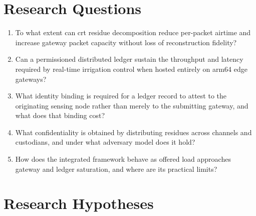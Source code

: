 \documentclass[12pt,a4paper,oneside]{book}
\begin{document}
\section{Research Questions}
\label{sec:research_questions}

\begin{enumerate}[label=\textbf{RQ\arabic*.}]
  \item To what extent can \gls{crt} residue decomposition reduce per-packet
        airtime and increase gateway packet capacity without loss of
        reconstruction fidelity?
  \item Can a permissioned distributed ledger sustain the throughput and latency
        required by real-time irrigation control when hosted entirely on
        \gls{arm64} edge gateways?
  \item What identity binding is required for a ledger record to attest to the
        originating sensing node rather than merely to the submitting gateway,
        and what does that binding cost?
  \item What confidentiality is obtained by distributing residues across
        channels and custodians, and under what adversary model does it hold?
  \item How does the integrated framework behave as offered load approaches
        gateway and ledger saturation, and where are its practical limits?
\end{enumerate}

\section{Research Hypotheses}
\label{sec:hypotheses}
\end{document}
